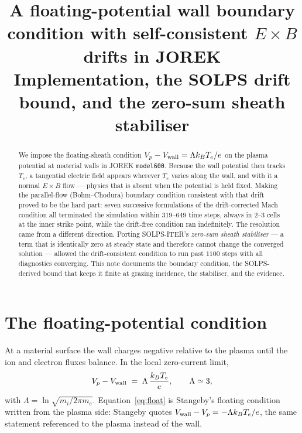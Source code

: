 \documentclass[11pt,a4paper]{article}
\title{A floating-potential wall boundary condition with self-consistent $E\times B$ drifts
in JOREK \code{model600}\\[2pt]
\large Implementation, the SOLPS drift bound, and the zero-sum sheath stabiliser}
\author{}
\date{}
\newcommand{\code}[1]{\texttt{\small #1}}
\begin{document}
\maketitle
\vspace{-10mm}

\begin{abstract}
\noindent
We impose the floating-sheath condition $V_p-V_{\rm wall}=\Lambda k_BT_e/e$ on the plasma
potential at material walls in JOREK \code{model600}. Because the wall potential then tracks
$T_e$, a tangential electric field appears wherever $T_e$ varies along the wall, and with it a
normal $E\times B$ flow --- physics that is absent when the potential is held fixed. Making the
parallel-flow (Bohm--Chodura) boundary condition consistent with that drift proved to be the hard
part: seven successive formulations of the drift-corrected Mach condition all terminated the
simulation within $319$--$649$ time steps, always in $2$--$3$ cells at the inner strike point,
while the drift-free condition ran indefinitely. The resolution came from a different direction.
Porting SOLPS-ITER's \emph{zero-sum sheath stabiliser} --- a term that is identically zero at
steady state and therefore cannot change the converged solution --- allowed the drift-consistent
condition to run past $1100$ steps with all diagnostics converging. This note documents the
boundary condition, the SOLPS-derived bound that keeps it finite at grazing incidence, the
stabiliser, and the evidence.
\end{abstract}

\section{The floating-potential condition}

At a material surface the wall charges negative relative to the plasma until the ion and electron
fluxes balance. In the local zero-current limit,
\begin{equation}
V_p - V_{\rm wall} \;=\; \Lambda\,\frac{k_BT_e}{e},\qquad \Lambda \simeq 3 ,
\label{eq:float}
\end{equation}
with $\Lambda=\ln\sqrt{m_i/2\pi m_e}$. Equation~\eqref{eq:float} is Stangeby's floating condition
written from the plasma side: Stangeby quotes $V_{\rm wall}-V_p=-\Lambda k_BT_e/e$, the same
statement referenced to the plasma instead of the wall.
\end{document}
